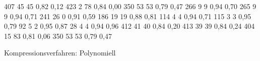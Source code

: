 \begin{table}[p]
\begin{datatabular}
     {407} {45} {45} {0,82} {0,12}
     {423} {2} {78} {0,84} {0,00}
     {350} {53} {53} {0,79} {0,47}
     {266} {9} {9} {0,94} {0,70}
     {265} {9} {9} {0,94} {0,71}
     {241} {26} {0} {0,91} {0,59}
     {186} {19} {19} {0,88} {0,81}
     {114} {4} {4} {0,94} {0,71}
     {115} {3} {3} {0,95} {0,79}
     {92} {5} {2} {0,95} {0,87}
     {28} {4} {4} {0,94} {0,96}
     {412} {41} {40} {0,84} {0,20}
     {413} {39} {39} {0,84} {0,24}
     {404} {15} {83} {0,81} {0,06}
     {350} {53} {53} {0,79} {0,47}
  \end{datatabular}
  \caption{Kompressionsverfahren: Polynomiell}\label{tab:datakomppol}
 \end{table}

